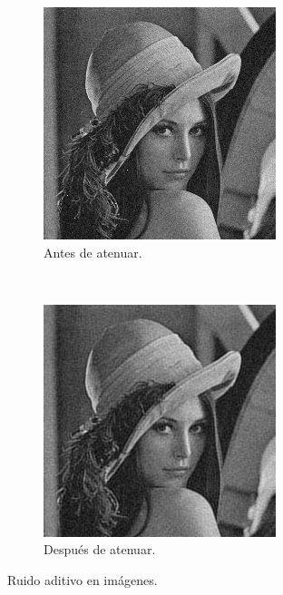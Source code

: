 \documentclass[a4paper,10pt,twoside]{article}
\begin{document}
\begin{figure}[H]
  \centering
  \begin{subfigure}[b]{0.45\textwidth}
    \centering
    \includegraphics[width=\textwidth]{graficos/lena_aditivo_muestra.png}    
    \caption{Antes de atenuar.}
  \end{subfigure}
  ~ 
  \begin{subfigure}[b]{0.45\textwidth}
    \centering
    \includegraphics[width=\textwidth]{graficos/lena_aditivo_atenuar_muestra.png}
    \caption{Después de atenuar.}
  \end{subfigure}
  \caption{Ruido aditivo en imágenes.}
\end{figure}
\end{document}
